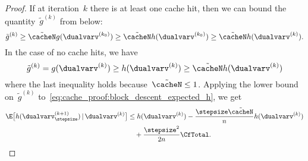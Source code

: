\documentclass{article}
\begin{document}
\begin{proof}
If at iteration~$k$ there is at least one cache hit, then we can bound the quantity~$\tilde{g}^{(k)}$ from below:\\[-2mm]
\begin{equation}
\label{eq:cache_proof:case_one_cache_hit}
\tilde{g}^{(k)} \geq \tilde{\cacheN} g(\dualvarv^{(k_0)}) \geq \tilde{\cacheN} h(\dualvarv^{(k_0)}) \geq \tilde{\cacheN} h(\dualvarv^{(k)}).
\end{equation}
In the case of no cache hits, we have\\[-2mm]
\[
\tilde{g}^{(k)} = g(\dualvarv^{(k)}) \geq h(\dualvarv^{(k)}) \geq \tilde{\cacheN} h(\dualvarv^{(k)})
\]
where the last inequality holds because~$\tilde{\cacheN} \leq 1$. Applying the lower bound on~$\tilde{g}^{(k)}$ to~\eqref{eq:cache_proof:block_descent_expected_h}, we get
\begin{equation}
\begin{aligned}
\label{eq:cache_proof:block_descent_expected_h_bounded}
    \E\big[ h({ \dualvarv^{(k+1)}_\stepsize})\,|\, { \dualvarv^{(k)}}\big] &\leq h(\dualvarv^{(k)}) - \frac{\stepsize\tilde{\cacheN}}{n} h(\dualvarv^{(k)}) \\ &\quad+ \frac{\stepsize^2}{2n}\CfTotal.
\end{aligned}
\end{equation}




\end{proof}
\end{document}
